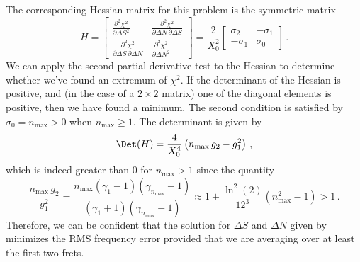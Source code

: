 The corresponding Hessian matrix for this problem is the symmetric matrix
 \begin{equation}
H = \begin{bmatrix}
      \frac{\partial^2 \chi^2}{\partial \Delta S^2} & \frac{\partial^2 \chi^2}{\partial \Delta N\, \partial \Delta S} \\
      \frac{\partial^2 \chi^2}{\partial \Delta S\, \partial \Delta N} & \frac{\partial^2 \chi^2}{\partial \Delta N^2}
    \end{bmatrix}
  = \frac{2}{X_0^2} \begin{bmatrix}
      \sigma_2 & -\sigma_1 \\
      -\sigma_1 & \sigma_0
    \end{bmatrix}\, .
 \end{equation}
We can apply the second partial derivative test to the Hessian to determine whether we've found an extremum of $\chi^2$. If the determinant of the Hessian is positive, and (in the case of a $2 \times 2$ matrix) one of the diagonal elements is positive, then we have found a minimum. The second condition is satisfied by $\sigma_0 = n_\text{max} > 0$ when $n_\text{max} \ge 1$. The determinant is given by
\begin{equation}
  \Det(H) = \frac{4}{X_0^4} \left(n_\text{max}\, g_2 - g_1^2\right)\, ,
\end{equation}
which is indeed greater than 0 for $n_\text{max} > 1$ since the quantity
\begin{equation}
  \frac{n_\text{max}\, g_2}{g_1^2} = \frac{n_\text{max} (\gamma_1 - 1)(\gamma_{n_\text{max}} + 1)}{(\gamma_1 + 1)(\gamma_{n_\text{max}} - 1)} \approx 1 + \frac{\ln^2(2)}{12^3} \left(n^2_\text{max} - 1\right) > 1\, .
\end{equation}
Therefore, we can be confident that the solution for $\Delta S$ and $\Delta N$ given by  minimizes the RMS frequency error provided that we are averaging over at least the first two frets.

